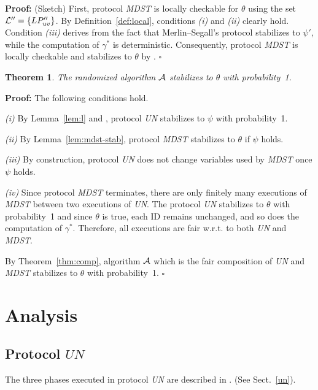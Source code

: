 \documentclass[10pt]{article}
\newtheorem{thm}{Theorem}[section]
\newenvironment{proof}{\begin{trivlist}
                       \item[]\hspace{0cm}\textbf{Proof: }
                       \hspace{0cm} }{\hfill $\square$
                       \end{trivlist}}
\begin{document}
\begin{proof} (Sketch) First, protocol {\em MDST} is locally checkable for
$\theta$ using the set ${\cal L''}=\{LP''_{uv}\}$.
By Definition~\ref{def:local}, conditions {\em (i)} and {\em (ii)} clearly
hold.
Condition {\em (iii)} derives from the fact that Merlin--Segall's
protocol stabilizes to $\psi'$, while the computation of $\gamma^*$ is
deterministic. Consequently, protocol {\em MDST} is locally checkable
and stabilizes to $\theta$ by \cite[Theorem~10]{APVD94}.
\end{proof}

\begin{thm}\label{thm:algostab}
The randomized algorithm $\cal A$ stabilizes to $\theta$ with probability~1.
\end{thm}

\begin{proof} The following conditions hold.

{\em (i)} By Lemma~\ref{lem:l} and \cite[Theorem~10]{APVD94},
protocol {\em UN} stabilizes to $\psi$ with probability~1.

{\em (ii)} By Lemma~\ref{lem:mdst-stab},
protocol {\em MDST} stabilizes to $\theta$ if $\psi$ holds.

{\em (iii)} By construction,
protocol {\em UN} does not change variables used by {\em MDST}
once $\psi$ holds.

{\em (iv)} Since protocol {\em MDST} terminates,
there are only finitely many executions of {\em MDST} between two
executions of {\em UN}. The protocol {\em UN} stabilizes to
$\theta$ with probability~1
and since $\theta$ is true, each ID remains unchanged,
and so does the computation of $\gamma^*$. Therefore,
all executions are fair w.r.t. to both {\em UN} and {\em MDST}.

By Theorem~\ref{thm:comp}, algorithm $\cal A$ which is the
fair composition of {\em UN} and {\em MDST} stabilizes to $\theta$
with probability~1.
\end{proof}

\section{Analysis}\label{anal}

\subsection{Protocol $UN$}
The three phases executed in protocol {\em UN} are described in
\cite{AnEH92,BuBL95}. (See Sect.~\ref{un}).
\end{document}
